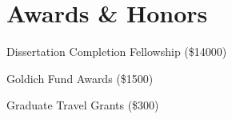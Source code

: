 \section{Awards \& Honors}
\begin{cvlist}
    \item Dissertation Completion Fellowship (\$14000)
    \item Goldich Fund Awards (\$1500)
    \item Graduate Travel Grants (\$300)
\end{cvlist}
